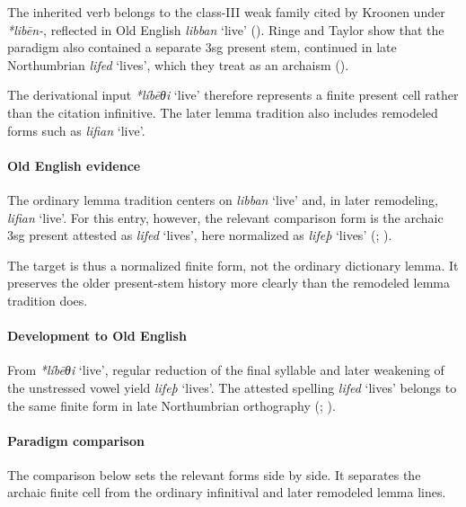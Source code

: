\documentclass[
  british,
  a4paper,
]{article}
\providecommand{\Recon}[1]{\emph{*#1}}
\begin{document}
The inherited verb belongs to the class-III weak family cited by Kroonen
under \emph{*libēn-}, reflected in Old English {\emph{libban}} `live'
(). Ringe and Taylor show
that the paradigm also contained a separate 3sg present stem, continued
in late Northumbrian {\emph{lifed}} `lives', which they treat as an
archaism ().

The derivational input \Recon{líbēθi} `live' therefore represents a
finite present cell rather than the citation infinitive. The later lemma
tradition also includes remodeled forms such as {\emph{lifian}} `live'.

\paragraph{Old English evidence}\label{old-english-evidence-125}

The ordinary lemma tradition centers on {\emph{libban}} `live' and, in
later remodeling, {\emph{lifian}} `live'. For this entry, however, the
relevant comparison form is the archaic 3sg present attested as
{\emph{lifed}} `lives', here normalized as {\emph{lifeþ}} `lives'
(;
).

The target is thus a normalized finite form, not the ordinary dictionary
lemma. It preserves the older present-stem history more clearly than the
remodeled lemma tradition does.

\paragraph{Development to Old
English}\label{development-to-old-english-125}

From \Recon{líbēθi} `live', regular reduction of the final syllable and
later weakening of the unstressed vowel yield {\emph{lifeþ}} `lives'.
The attested spelling {\emph{lifed}} `lives' belongs to the same finite
form in late Northumbrian orthography
(;
).

\paragraph{Paradigm comparison}\label{paradigm-comparison-8}

The comparison below sets the relevant forms side by side. It separates
the archaic finite cell from the ordinary infinitival and later
remodeled lemma lines.
\end{document}
